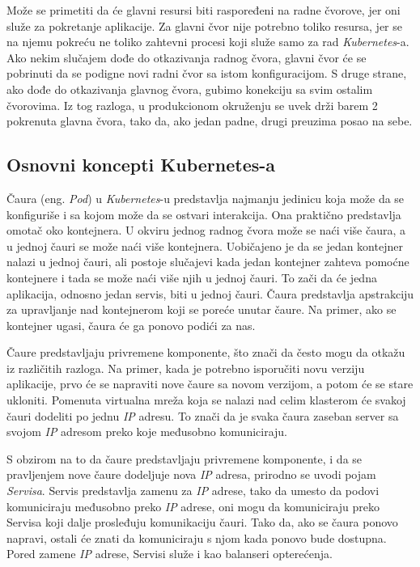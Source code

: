 Može se primetiti da će glavni resursi biti raspoređeni na radne čvorove, jer oni služe za pokretanje 
aplikacije. Za glavni čvor nije potrebno toliko resursa, jer se na njemu pokreću ne toliko zahtevni procesi 
koji služe samo za rad \textit{Kubernetes}-a. Ako nekim slučajem dođe do otkazivanja radnog čvora, glavni čvor 
će se pobrinuti da se podigne novi radni čvor sa istom konfiguracijom. S druge strane, ako dođe do 
otkazivanja glavnog čvora, gubimo konekciju sa svim ostalim čvorovima. Iz tog razloga, u produkcionom 
okruženju se uvek drži barem 2 pokrenuta glavna čvora, tako da, ako jedan padne, drugi preuzima 
posao na sebe.

\subsection{Osnovni koncepti Kubernetes-a}
Čaura (eng. {\em Pod}) u \textit{Kubernetes}-u predstavlja najmanju jedinicu koja može da se konfiguriše i sa kojom može da 
se ostvari interakcija. Ona praktično predstavlja omotač oko kontejnera. U okviru jednog radnog čvora 
može se naći više čaura, a u jednoj čauri se može naći više kontejnera. Uobičajeno je da se jedan 
kontejner nalazi u jednoj čauri, ali postoje slučajevi kada jedan kontejner zahteva pomoćne kontejnere 
i tada se može naći više njih u jednoj čauri. To zači da će jedna aplikacija, odnosno jedan servis, 
biti u jednoj čauri. Čaura predstavlja apstrakciju za upravljanje nad kontejnerom koji se poreće unutar
čaure. Na primer, ako se kontejner ugasi, čaura će ga ponovo podići za nas. 

Čaure predstavljaju privremene komponente, što znači da često mogu da otkažu iz različitih razloga. 
Na primer, kada je potrebno isporučiti novu verziju aplikacije, prvo će se napraviti nove čaure sa 
novom verzijom, a potom će se stare ukloniti. Pomenuta virtualna mreža koja se nalazi nad celim 
klasterom će svakoj čauri dodeliti po jednu \textit{IP} adresu. To znači da je svaka čaura zaseban server sa 
svojom \textit{IP} adresom preko koje međusobno komuniciraju.

S obzirom na to da čaure predstavljaju privremene komponente, i da se pravljenjem nove čaure dodeljuje 
nova \textit{IP} adresa, prirodno se uvodi pojam {\em Servisa}. Servis predstavlja zamenu za \textit{IP} adrese, tako 
da umesto da podovi komuniciraju međusobno preko \textit{IP} adrese, oni mogu da komuniciraju preko Servisa 
koji dalje prosleđuju komunikaciju čauri. Tako da, ako se čaura ponovo napravi, ostali će znati da komuniciraju 
s njom kada ponovo bude dostupna. Pored zamene \textit{IP} adrese, Servisi služe i kao balanseri opterećenja. 

